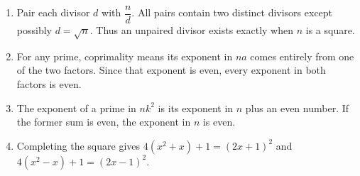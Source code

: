 \begin{enumerate}
\item Pair each divisor $d$ with $\dfrac{n}{d}$. All pairs contain two distinct divisors except possibly $d=\sqrt n$. Thus an unpaired divisor exists exactly when $n$ is a square.
\item For any prime, coprimality means its exponent in $na$ comes entirely from one of the two factors. Since that exponent is even, every exponent in both factors is even.
\item The exponent of a prime in $nk^2$ is its exponent in $n$ plus an even number. If the former sum is even, the exponent in $n$ is even.
\item Completing the square gives $4(x^2+x)+1=(2x+1)^2$ and $4(x^2-x)+1=(2x-1)^2$.
\end{enumerate}
